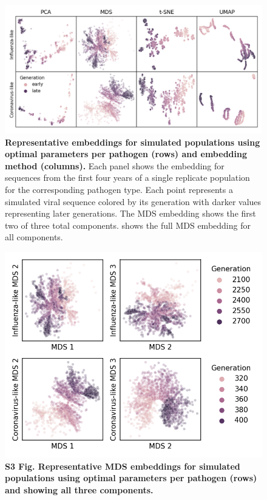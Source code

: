 \documentclass[10pt,letterpaper]{article}
\begin{document}
\begin{figure}[!h]
\includegraphics[width=\columnwidth]{figures/simulated-populations-representative-embeddings.png}
\caption{{\bf Representative embeddings for simulated populations using optimal parameters per pathogen (rows) and embedding method (columns).}
  Each panel shows the embedding for sequences from the first four years of a single replicate population for the corresponding pathogen type.
  Each point represents a simulated viral sequence colored by its generation with darker values representing later generations.
  The MDS embedding shows the first two of three total components.
   shows the full MDS embedding for all components.}
\label{fig:simulated-populations-representative-embeddings}
\end{figure}

\begin{figure}[!h]
\includegraphics[width=\columnwidth]{figures/simulated-populations-representative-mds-embeddings.png}
\caption*{{\bf S3 Fig. Representative MDS embeddings for simulated populations using optimal parameters per pathogen (rows) and showing all three components.}}
\end{figure}
\end{document}
